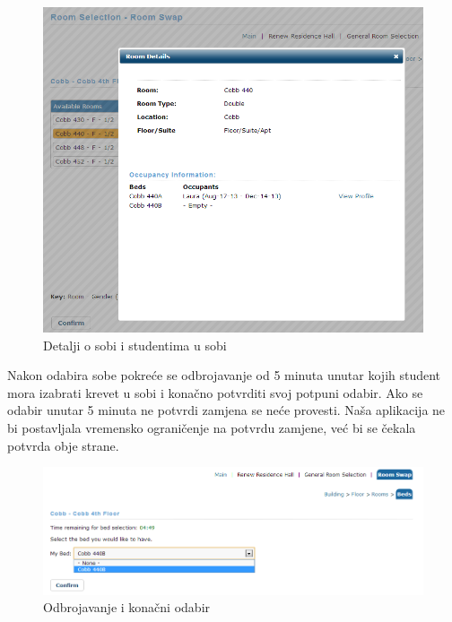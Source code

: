 		\begin{figure}[H]
			\includegraphics[scale=0.4]{slike/rs10.png} %
			\centering
			\caption{Detalji o sobi i studentima u sobi}
			\label{fig:promjene3}
		\end{figure}
	
		Nakon odabira sobe pokreće se odbrojavanje od 5 minuta unutar kojih student mora izabrati krevet u sobi i konačno potvrditi svoj potpuni odabir. Ako se odabir unutar 5 minuta ne potvrdi zamjena se neće provesti. Naša aplikacija ne bi postavljala vremensko ograničenje na potvrdu zamjene, već bi se čekala potvrda obje strane.
		
		\begin{figure}[H]
			\includegraphics[scale=0.5]{slike/rs11.png} %
			\centering
			\caption{Odbrojavanje i konačni odabir}
			\label{fig:promjene4}
		\end{figure}
	
		\clearpage
		
		
		
		\eject
		
	
